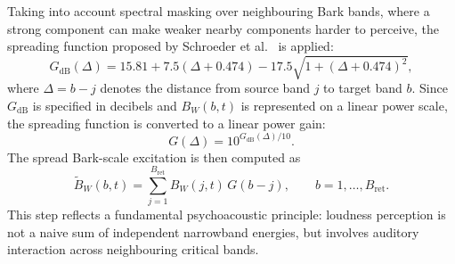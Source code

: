 Taking into account spectral masking over neighbouring Bark bands, where a strong component can make weaker nearby components harder to perceive, the spreading function proposed by Schroeder et al.~\cite{schroeder1979masking} is applied:
\begin{equation}
G_{\mathrm{dB}}(\Delta)
=15.81 + 7.5(\Delta +0.474)
-17.5\sqrt{1+(\Delta +0.474)^2},
\label{eq:bg:spreading_function_db}
\end{equation}
where $\Delta=b-j$ denotes the distance from source band $j$ to target band $b$. Since $G_{\mathrm{dB}}$ is specified in decibels and $B_W(b,t)$ is represented on a linear power scale, the spreading function is converted to a linear power gain:
\begin{equation}
G(\Delta)=10^{G_{\mathrm{dB}}(\Delta)/10}.
\label{eq:bg:spreading_function_linear}
\end{equation}
The spread Bark-scale excitation is then computed as
\begin{equation}
\widetilde{B}_W(b,t)
=
\sum_{j=1}^{B_{\mathrm{ret}}} B_W(j,t)\,G(b-j),
\qquad b=1,\ldots,B_{\mathrm{ret}}.
\label{eq:bg:spread_bark_excitation}
\end{equation}
This step reflects a fundamental psychoacoustic principle: loudness perception is not a naive sum of independent narrowband energies, but involves auditory interaction across neighbouring critical bands.

